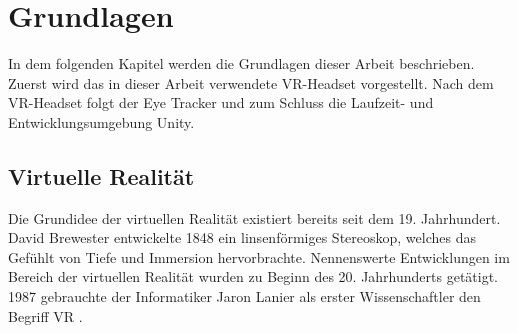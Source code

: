
\chapter{Grundlagen}
In dem folgenden Kapitel werden die Grundlagen dieser Arbeit beschrieben. Zuerst wird das in dieser Arbeit verwendete \acs{VR}-Headset vorgestellt. Nach dem \acs{VR}-Headset  folgt der Eye Tracker und zum Schluss die Laufzeit- und Entwicklungsumgebung Unity.

\section{Virtuelle Realität}
Die Grundidee der virtuellen Realität existiert bereits seit dem 19. Jahrhundert. David Brewester entwickelte 1848 ein linsenförmiges Stereoskop, welches das Gefühlt von Tiefe und Immersion hervorbrachte. Nennenswerte Entwicklungen im Bereich der virtuellen Realität wurden zu Beginn des 20. Jahrhunderts getätigt. \cite[S. 1f]{Singh.2017} 1987 gebrauchte der Informatiker Jaron Lanier als erster Wissenschaftler den Begriff \ac{VR} \cite{Doerner2019}. 

